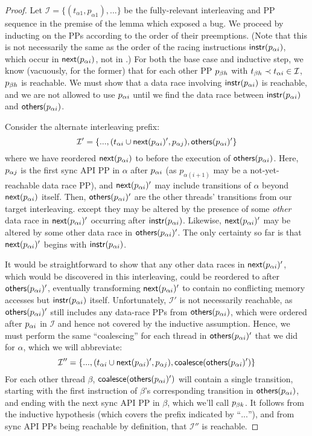 \begin{proof}
Let $\mathcal{I} = \{(t_{\alpha{}1}, p_{\alpha{}1}), ...\}$ be the fully-relevant interleaving and PP sequence in the premise of the lemma which exposed a bug.
We proceed by inducting on the PPs according to the order of their preemptions.
(Note that this is not necessarily the same as the order of the racing instructions $\mathsf{instr}(p_{\alpha{}i})$, which occur in $\mathsf{next}(p_{\alpha{}i})$, not in \tai.)
For both the base case and inductive step, we know (vacuously, for the former) that for each other PP $p_{\beta{}h}$ with $t_{\beta{}h} \prec t_{\alpha{}i} \in \mathcal{I}$, $p_{\beta{}h}$ is reachable.
We must show that a data race involving $\mathsf{instr}(p_{\alpha{}i})$
is reachable, and we are not allowed to use $p_{\alpha{}i}$ until we find the data race between $\mathsf{instr}(p_{\alpha{}i})$ and $\mathsf{others}(p_{\alpha{}i})$.

Consider the alternate interleaving prefix:
\[
	\mathcal{I}' = \{..., (t_{\alpha{}i} \cup \mathsf{next}(p_{\alpha{}i})', p_{\alpha{}j}), \mathsf{others}(p_{\alpha{}i})' \}
\]
where we have reordered $\mathsf{next}(p_{\alpha{}i})$ to before the execution of $\mathsf{others}(p_{\alpha{}i})$.
Here, $p_{\alpha{}j}$ is the first sync API PP in $\alpha$ after $p_{\alpha{}i}$ (as $p_{\alpha(i+1)}$ may be a not-yet-reachable data race PP),
and $\mathsf{next}(p_{\alpha{}i})'$ may include transitions of $\alpha$ beyond $\mathsf{next}(p_{\alpha{}i})$ itself.
Then, $\mathsf{others}(p_{\alpha{}i})'$ are the other threads' transitions from our target interleaving.
except they may be altered by the presence of some {\em other} data race in $\mathsf{next}(p_{\alpha{}i})'$ occurring after $\mathsf{instr}(p_{\alpha{}i})$.
Likewise, $\mathsf{next}(p_{\alpha{}i})'$ may be altered by some other data race in $\mathsf{others}(p_{\alpha{}i})'$.
The only certainty so far is that $\mathsf{next}(p_{\alpha{}i})'$ begins with $\mathsf{instr}(p_{\alpha{}i})$.

It would be straightforward to show that any other data races in $\mathsf{next}(p_{\alpha{}i})'$, which would be discovered in this interleaving,
could be reordered to after $\mathsf{others}(p_{\alpha{}i})'$,
eventually transforming $\mathsf{next}(p_{\alpha{}i})'$ to contain no conflicting memory accesses but $\mathsf{instr}(p_{\alpha{}i})$ itself.
Unfortunately, $\mathcal{I}'$ is not necessarily reachable, as $\mathsf{others}(p_{\alpha{}i})'$ still includes any data-race PPs from $\mathsf{others}(p_{\alpha{}i})$,
which were ordered after $p_{\alpha{}i}$ in $\mathcal{I}$ and hence not covered by the inductive assumption.
Hence, we must perform the same ``coalescing'' for each thread in $\mathsf{others}(p_{\alpha{}i})'$ that we did for $\alpha$,
which we will abbreviate:
\[
	\mathcal{I}'' = \{..., (t_{\alpha{}i} \cup \mathsf{next}(p_{\alpha{}i})', p_{\alpha{}j}), \mathsf{coalesce}(\mathsf{others}(p_{\alpha{}i})') \}
\]
For each other thread $\beta$, $\mathsf{coalesce}(\mathsf{others}(p_{\alpha{}i})')$ will contain a single transition,
starting with the first instruction of $\beta$'s corresponding transition in $\mathsf{others}(p_{\alpha{}i})$,
and ending with the next sync API PP in $\beta$, which we'll call $p_{\beta{}k}$.
It follows from the inductive hypothesis (which covers the prefix indicated by ``$...$''),
and from sync API PPs being reachable by definition,
that $\mathcal{I''}$ is reachable.


\end{proof}
